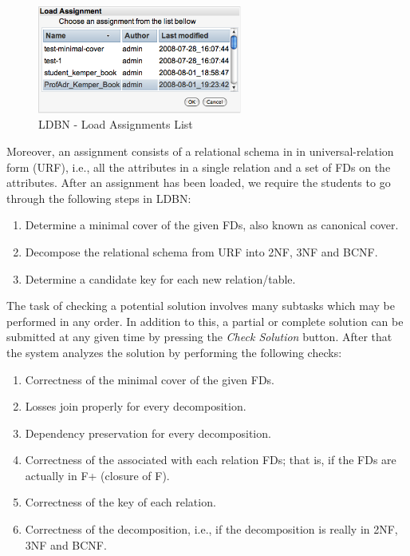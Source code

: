 \begin{figure}[h]
	\begin{center}
		\includegraphics[width=0.6\textwidth]{./img/screen02.png}
		\caption{LDBN - Load Assignments List}
		\label{fig:screen02}
	\end{center}
\end{figure}

Moreover, an assignment consists of a relational schema in in 
universal-relation form (URF), i.e., all the attributes in a single relation 
and a set of FDs on the attributes. 
After an assignment has been loaded, we require the students to go through the 
following steps in LDBN:
\begin{enumerate}
	\item Determine a minimal cover of the given FDs, also known as canonical cover.
	\item Decompose the relational schema from URF into 2NF, 3NF and BCNF. 
	\item Determine a candidate key for each new relation/table. 
\end{enumerate}

The task of checking a potential solution
involves many subtasks which may be performed in any order. In addition to this,  a partial or complete 
solution can be submitted at any given time by pressing the \textit{Check Solution} button. 
After that the system analyzes the solution by performing the following checks:
\begin{enumerate}
	\item Correctness of the minimal cover of the given FDs. 
	\item Losses join properly for every decomposition.
	\item Dependency preservation for every decomposition.
	\item Correctness of the associated with each relation FDs; that is, if the FDs are actually in F+ (closure of F).
	\item Correctness of the key of each relation.
	\item Correctness of the decomposition, i.e., if the decomposition is really in 2NF, 3NF and BCNF.
\end{enumerate}

